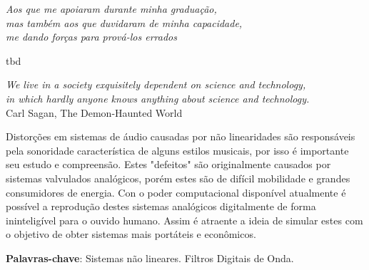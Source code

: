 
\begin{dedicatoria}
	\vspace*{\fill}
	\centering
	\noindent
	\textit{Aos que me apoiaram durante minha graduação, \\ mas também aos que duvidaram de minha capacidade, \\me dando forças para prová-los errados} \vspace*{\fill}
\end{dedicatoria}


\begin{agradecimentos}
tbd
\end{agradecimentos}


\begin{epigrafe}
	\vspace*{\fill}
	\begin{flushright} 
		\textit{We live in a society exquisitely dependent on science and technology,\\ in which hardly anyone knows anything about science and technology.}\\ \vspace{\onelineskip}
		Carl Sagan, The Demon-Haunted World
	\end{flushright}
\end{epigrafe}


\setlength{\absparsep}{18pt} %
\begin{resumo}
	Distorções em sistemas de áudio causadas por não linearidades são responsáveis pela sonoridade característica de alguns estilos musicais, por isso é importante seu estudo e compreensão. Estes "defeitos" são originalmente causados por sistemas valvulados analógicos, porém estes são de difícil mobilidade e grandes consumidores de energia. Con o poder computacional disponível atualmente é possível a reprodução destes sistemas analógicos digitalmente de forma ininteligível para o ouvido humano. Assim é atraente a ideia de simular estes com o objetivo de obter sistemas mais portáteis e econômicos.

	\vspace{\onelineskip}
	\textbf{Palavras-chave}: Sistemas não lineares. Filtros Digitais de Onda.
\end{resumo}


